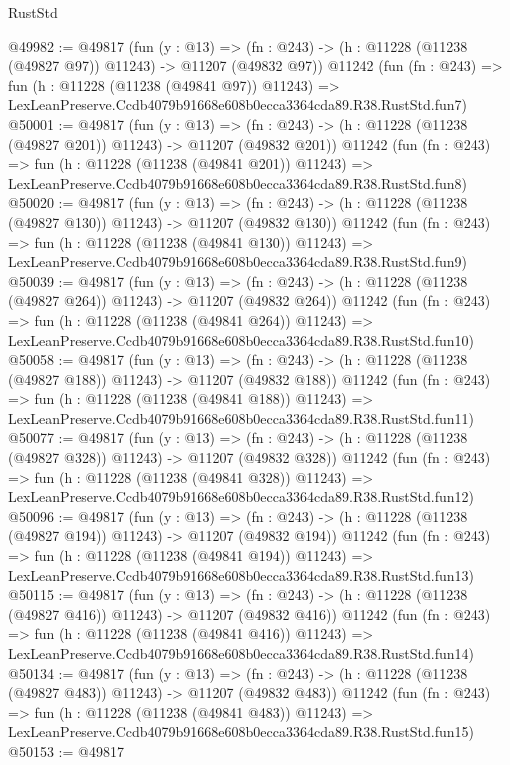 \begin{lexlean}{RustStd}
\begin{coremodule}
@49982 := @49817
    (fun (y : @13) =>
    (fn : @243) -> (h : @11228 (@11238 (@49827 @97)) @11243) -> @11207 (@49832 @97))
    @11242
    (fun (fn : @243) =>
    fun (h : @11228 (@11238 (@49841 @97)) @11243) =>
    LexLeanPreserve.Ccdb4079b91668e608b0ecca3364cda89.R38.RustStd.fun7)
@50001 := @49817
    (fun (y : @13) =>
    (fn : @243) -> (h : @11228 (@11238 (@49827 @201)) @11243) -> @11207 (@49832 @201))
    @11242
    (fun (fn : @243) =>
    fun (h : @11228 (@11238 (@49841 @201)) @11243) =>
    LexLeanPreserve.Ccdb4079b91668e608b0ecca3364cda89.R38.RustStd.fun8)
@50020 := @49817
    (fun (y : @13) =>
    (fn : @243) -> (h : @11228 (@11238 (@49827 @130)) @11243) -> @11207 (@49832 @130))
    @11242
    (fun (fn : @243) =>
    fun (h : @11228 (@11238 (@49841 @130)) @11243) =>
    LexLeanPreserve.Ccdb4079b91668e608b0ecca3364cda89.R38.RustStd.fun9)
@50039 := @49817
    (fun (y : @13) =>
    (fn : @243) -> (h : @11228 (@11238 (@49827 @264)) @11243) -> @11207 (@49832 @264))
    @11242
    (fun (fn : @243) =>
    fun (h : @11228 (@11238 (@49841 @264)) @11243) =>
    LexLeanPreserve.Ccdb4079b91668e608b0ecca3364cda89.R38.RustStd.fun10)
@50058 := @49817
    (fun (y : @13) =>
    (fn : @243) -> (h : @11228 (@11238 (@49827 @188)) @11243) -> @11207 (@49832 @188))
    @11242
    (fun (fn : @243) =>
    fun (h : @11228 (@11238 (@49841 @188)) @11243) =>
    LexLeanPreserve.Ccdb4079b91668e608b0ecca3364cda89.R38.RustStd.fun11)
@50077 := @49817
    (fun (y : @13) =>
    (fn : @243) -> (h : @11228 (@11238 (@49827 @328)) @11243) -> @11207 (@49832 @328))
    @11242
    (fun (fn : @243) =>
    fun (h : @11228 (@11238 (@49841 @328)) @11243) =>
    LexLeanPreserve.Ccdb4079b91668e608b0ecca3364cda89.R38.RustStd.fun12)
@50096 := @49817
    (fun (y : @13) =>
    (fn : @243) -> (h : @11228 (@11238 (@49827 @194)) @11243) -> @11207 (@49832 @194))
    @11242
    (fun (fn : @243) =>
    fun (h : @11228 (@11238 (@49841 @194)) @11243) =>
    LexLeanPreserve.Ccdb4079b91668e608b0ecca3364cda89.R38.RustStd.fun13)
@50115 := @49817
    (fun (y : @13) =>
    (fn : @243) -> (h : @11228 (@11238 (@49827 @416)) @11243) -> @11207 (@49832 @416))
    @11242
    (fun (fn : @243) =>
    fun (h : @11228 (@11238 (@49841 @416)) @11243) =>
    LexLeanPreserve.Ccdb4079b91668e608b0ecca3364cda89.R38.RustStd.fun14)
@50134 := @49817
    (fun (y : @13) =>
    (fn : @243) -> (h : @11228 (@11238 (@49827 @483)) @11243) -> @11207 (@49832 @483))
    @11242
    (fun (fn : @243) =>
    fun (h : @11228 (@11238 (@49841 @483)) @11243) =>
    LexLeanPreserve.Ccdb4079b91668e608b0ecca3364cda89.R38.RustStd.fun15)
@50153 := @49817

\end{coremodule}
\end{lexlean}

